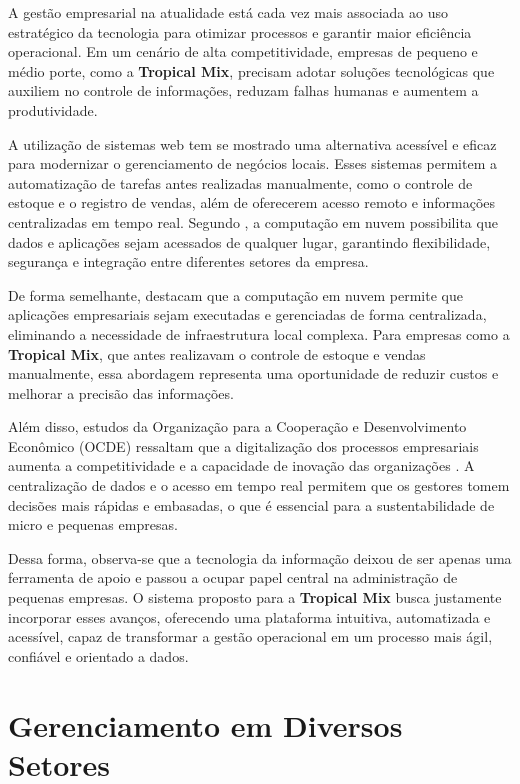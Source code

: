 A gestão empresarial na atualidade está cada vez mais associada ao uso estratégico da tecnologia para otimizar processos e garantir maior eficiência operacional. Em um cenário de alta competitividade, empresas de pequeno e médio porte, como a \textbf{Tropical Mix}, precisam adotar soluções tecnológicas que auxiliem no controle de informações, reduzam falhas humanas e aumentem a produtividade.

A utilização de sistemas web tem se mostrado uma alternativa acessível e eficaz para modernizar o gerenciamento de negócios locais. Esses sistemas permitem a automatização de tarefas antes realizadas manualmente, como o controle de estoque e o registro de vendas, além de oferecerem acesso remoto e informações centralizadas em tempo real. Segundo \cite{mell2011}, a computação em nuvem possibilita que dados e aplicações sejam acessados de qualquer lugar, garantindo flexibilidade, segurança e integração entre diferentes setores da empresa.

De forma semelhante, \cite[p.~2]{armbrust2009} destacam que a computação em nuvem permite que aplicações empresariais sejam executadas e gerenciadas de forma centralizada, eliminando a necessidade de infraestrutura local complexa. Para empresas como a \textbf{Tropical Mix}, que antes realizavam o controle de estoque e vendas manualmente, essa abordagem representa uma oportunidade de reduzir custos e melhorar a precisão das informações.

Além disso, estudos da Organização para a Cooperação e Desenvolvimento Econômico (OCDE) ressaltam que a digitalização dos processos empresariais aumenta a competitividade e a capacidade de inovação das organizações \cite{oecd2014}. A centralização de dados e o acesso em tempo real permitem que os gestores tomem decisões mais rápidas e embasadas, o que é essencial para a sustentabilidade de micro e pequenas empresas.

Dessa forma, observa-se que a tecnologia da informação deixou de ser apenas uma ferramenta de apoio e passou a ocupar papel central na administração de pequenas empresas. O sistema proposto para a \textbf{Tropical Mix} busca justamente incorporar esses avanços, oferecendo uma plataforma intuitiva, automatizada e acessível, capaz de transformar a gestão operacional em um processo mais ágil, confiável e orientado a dados.


\section{Gerenciamento em Diversos Setores}

